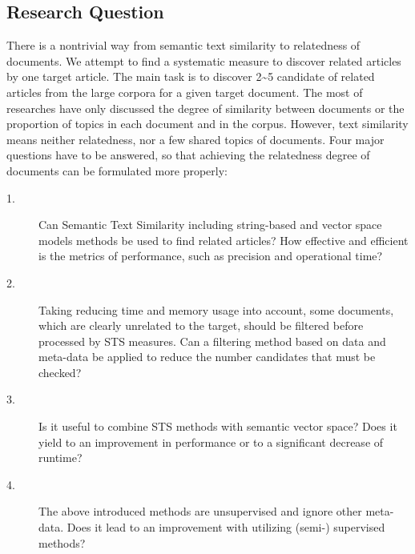 \subsection{Research Question}

There is a nontrivial way from semantic text similarity to relatedness of documents. We attempt to find a systematic measure to discover related articles by one target article. The main task is to discover 2\textasciitilde 5 candidate of related articles from the large corpora for a given target document. The most of researches have only discussed the degree of similarity between documents or the proportion of topics in each document and in the corpus. However, text similarity means neither relatedness, nor a few shared topics of documents. Four major questions have to be answered, so that achieving the relatedness degree of documents can be formulated more properly: 

\begin{description}
    \item[1.] \label{q:1} Can Semantic Text Similarity including string-based and vector space models methods be used to find related articles? How effective and efficient is the metrics of performance, such as precision and operational time?
    \item[2.] \label{q:2} Taking reducing time and memory usage into account, some documents, which are clearly unrelated to the target, should be filtered before processed by STS measures.  Can a filtering method based on data and meta-data be applied to reduce the number candidates that must be checked?
    \item[3.] \label{q:3} Is it useful to combine STS methods with semantic vector space? Does it yield to an improvement in performance or to a significant decrease of runtime?
    \item[4.] \label{q:4} The above introduced methods are unsupervised and ignore other meta-data. Does it lead to an improvement with utilizing (semi-) supervised methods?
\end{description}